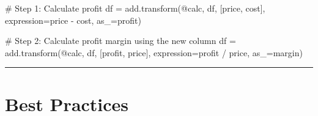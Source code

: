 \documentclass[
  letterpaper,
]{scrbook}
\newenvironment{Shaded}{\begin{snugshade}}{\end{snugshade}}
\newcommand{\CommentTok}[1]{\textcolor[rgb]{0.37,0.37,0.37}{#1}}
\newcommand{\NormalTok}[1]{\textcolor[rgb]{0.00,0.23,0.31}{#1}}
\newcommand{\OperatorTok}[1]{\textcolor[rgb]{0.37,0.37,0.37}{#1}}
\newcommand{\StringTok}[1]{\textcolor[rgb]{0.13,0.47,0.30}{#1}}
\begin{document}
\begin{Shaded}
\begin{Highlighting}[]
\CommentTok{\# Step 1: Calculate profit}
\NormalTok{df }\OperatorTok{=}\NormalTok{ add.transform(}\StringTok{\textquotesingle{}@calc\textquotesingle{}}\NormalTok{, df, [}\StringTok{\textquotesingle{}price\textquotesingle{}}\NormalTok{, }\StringTok{\textquotesingle{}cost\textquotesingle{}}\NormalTok{], }
\NormalTok{                   expression}\OperatorTok{=}\StringTok{\textquotesingle{}price {-} cost\textquotesingle{}}\NormalTok{, as\_}\OperatorTok{=}\StringTok{\textquotesingle{}profit\textquotesingle{}}\NormalTok{)}

\CommentTok{\# Step 2: Calculate profit margin using the new column}
\NormalTok{df }\OperatorTok{=}\NormalTok{ add.transform(}\StringTok{\textquotesingle{}@calc\textquotesingle{}}\NormalTok{, df, [}\StringTok{\textquotesingle{}profit\textquotesingle{}}\NormalTok{, }\StringTok{\textquotesingle{}price\textquotesingle{}}\NormalTok{], }
\NormalTok{                   expression}\OperatorTok{=}\StringTok{\textquotesingle{}profit / price\textquotesingle{}}\NormalTok{, as\_}\OperatorTok{=}\StringTok{\textquotesingle{}margin\textquotesingle{}}\NormalTok{)}
\end{Highlighting}
\end{Shaded}

\begin{center}\rule{0.5\linewidth}{0.5pt}\end{center}

\section{Best Practices}\label{best-practices}
\end{document}

